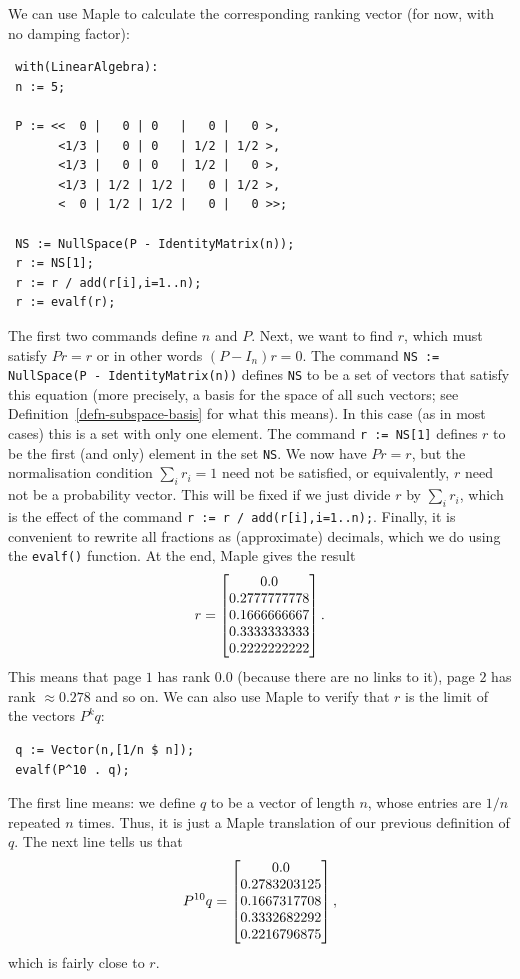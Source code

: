 \documentclass[reqno]{amsart}
\theoremstyle{definition}
\begin{document}
We can use Maple to calculate the corresponding ranking vector
(for now, with no damping factor):
\begin{verbatim}
 with(LinearAlgebra):
 n := 5;

 P := <<  0 |   0 | 0   |   0 |   0 >,
       <1/3 |   0 | 0   | 1/2 | 1/2 >,
       <1/3 |   0 | 0   | 1/2 |   0 >,
       <1/3 | 1/2 | 1/2 |   0 | 1/2 >,
       <  0 | 1/2 | 1/2 |   0 |   0 >>;

 NS := NullSpace(P - IdentityMatrix(n));
 r := NS[1];
 r := r / add(r[i],i=1..n);
 r := evalf(r);
\end{verbatim}
The first two commands define $n$ and $P$.  Next, we want to find $r$,
which must satisfy $Pr=r$ or in other words $(P-I_n)r=0$.  The command 
\verb+NS := NullSpace(P - IdentityMatrix(n))+ defines \verb+NS+ 
to be a set of vectors that satisfy this equation
(more precisely, a basis for the space of all such vectors; see
Definition~\ref{defn-subspace-basis} for what this means).  In this case (as
in most cases) this is a set with only one element.  The command
\verb+r := NS[1]+ defines $r$ to be the first (and only) element in
the set \verb+NS+.  We now have $Pr=r$, but the normalisation
condition $\sum_ir_i=1$ need not be satisfied, or equivalently, $r$
need not be a probability vector.  This will be fixed if we just
divide $r$ by $\sum_ir_i$, which is the effect of the command 
\verb+r := r / add(r[i],i=1..n);+.  Finally, it is convenient to
rewrite all fractions as (approximate) decimals, which we do using the
\verb+evalf()+ function.  At the end, Maple gives the result
\[ r = \left[\begin{matrix}  0.0 \\
             0.2777777778 \\
             0.1666666667 \\
             0.3333333333 \\
             0.2222222222
       \end{matrix}\right].
\]
This means that page $1$ has rank $0.0$ (because there are no links to
it), page $2$ has rank $\approx 0.278$ and so on.  We can also use Maple to
verify that $r$ is the limit of the vectors $P^kq$:
\begin{verbatim}
 q := Vector(n,[1/n $ n]);
 evalf(P^10 . q);
\end{verbatim}
The first line means: we define $q$ to be a vector of length $n$,
whose entries are $1/n$ repeated $n$ times.  Thus, it is just a Maple
translation of our previous definition of $q$.  The next line tells us
that 
\[ P^{10} q = \left[\begin{matrix}
    0.0 \\
    0.2783203125 \\
    0.1667317708 \\
    0.3332682292 \\
    0.2216796875
   \end{matrix}\right],
\]
which is fairly close to $r$.
\end{document}
